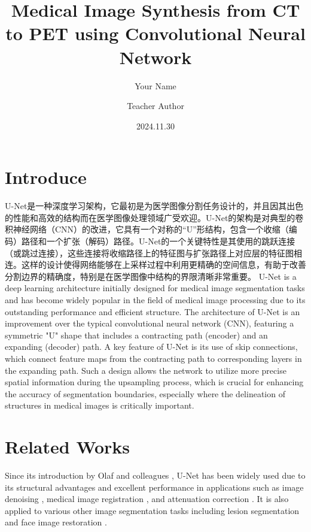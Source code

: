 \documentclass[twocolumn]{article}
\title{Medical Image Synthesis from CT to PET using Convolutional Neural Network}
\author[1] {Your Name}
\author[1] {Teacher Author}
\affil[1]{University of Fukui, 3-9-1 Bunkyo, Fukui, 910-0019, Japan}
\date{2024.11.30}
\begin{document}

\section{Introduce}
U-Net是一种深度学习架构，它最初是为医学图像分割任务设计的，并且因其出色的性能和高效的结构而在医学图像处理领域广受欢迎。U-Net的架构是对典型的卷积神经网络（CNN）的改进，它具有一个对称的“U”形结构，包含一个收缩（编码）路径和一个扩张（解码）路径。U-Net的一个关键特性是其使用的跳跃连接（或跳过连接），这些连接将收缩路径上的特征图与扩张路径上对应层的特征图相连。这样的设计使得网络能够在上采样过程中利用更精确的空间信息，有助于改善分割边界的精确度，特别是在医学图像中结构的界限清晰非常重要。
U-Net is a deep learning architecture initially designed for medical image segmentation tasks and has become widely popular in the field of medical image processing due to its outstanding performance and efficient structure. The architecture of U-Net is an improvement over the typical convolutional neural network (CNN), featuring a symmetric "U" shape that includes a contracting path (encoder) and an expanding (decoder) path. A key feature of U-Net is its use of skip connections, which connect feature maps from the contracting path to corresponding layers in the expanding path. Such a design allows the network to utilize more precise spatial information during the upsampling process, which is crucial for enhancing the accuracy of segmentation boundaries, especially where the delineation of structures in medical images is critically important.


\section{Related Works}
Since its introduction by Olaf and colleagues \cite{navab_u-net_2015}, U-Net has been widely used due to its structural advantages and excellent performance in applications such as image denoising \cite{armanious_medgan_2020}, medical image registration \cite{singh_automated_2023}, and attenuation correction \cite{liu_deep_2018}. It is also applied to various other image segmentation tasks including lesion segmentation \cite{du_medical_2020} and face image restoration \cite{zeng_swin-casunet_2022}.
\end{document}
